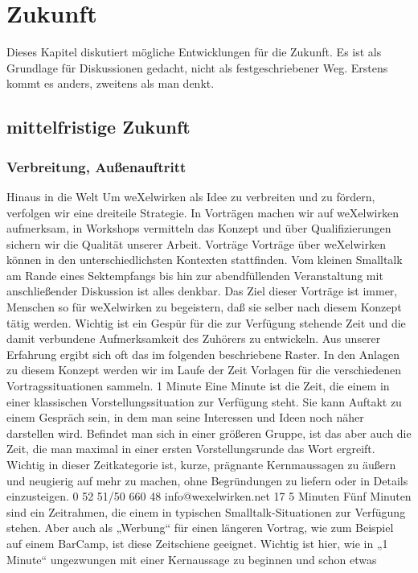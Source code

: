 \chapter{Zukunft}
Dieses Kapitel diskutiert mögliche Entwicklungen für die Zukunft.
%
Es ist als Grundlage für Diskussionen gedacht, nicht als festgeschriebener Weg.
%
Erstens kommt es anders, zweitens als man denkt.
  \section{mittelfristige Zukunft}
    \subsection{Verbreitung, Außenauftritt}
Hinaus in die Welt
Um weXelwirken als Idee zu verbreiten und zu fördern, verfolgen wir eine dreiteile Strategie. In 
Vorträgen machen wir auf weXelwirken aufmerksam, in Workshops vermitteln das Konzept und über 
Qualifizierungen sichern wir die Qualität unserer Arbeit.
Vorträge
Vorträge über weXelwirken können in den unterschiedlichsten Kontexten stattfinden. Vom kleinen 
Smalltalk am Rande eines Sektempfangs bis hin zur abendfüllenden Veranstaltung mit anschließender 
Diskussion ist alles denkbar. Das Ziel dieser Vorträge ist immer, Menschen so für weXelwirken zu 
begeistern, daß sie selber nach diesem Konzept tätig werden. Wichtig ist ein Gespür für die zur 
Verfügung stehende Zeit und die damit verbundene Aufmerksamkeit des Zuhörers zu entwickeln. Aus 
unserer Erfahrung ergibt sich oft das im folgenden beschriebene Raster. In den Anlagen zu diesem 
Konzept werden wir im Laufe der Zeit Vorlagen für die verschiedenen Vortragssituationen sammeln.
1 Minute
Eine Minute ist die Zeit, die einem in einer klassischen Vorstellungssituation zur Verfügung steht. Sie 
kann Auftakt zu einem Gespräch sein, in dem man seine Interessen und Ideen noch näher darstellen 
wird. Befindet man sich in einer größeren Gruppe, ist das aber auch die Zeit, die man maximal in einer 
ersten Vorstellungsrunde das Wort ergreift.
Wichtig in dieser Zeitkategorie ist, kurze, prägnante Kernmaussagen zu äußern und neugierig auf mehr 
zu machen, ohne Begründungen zu liefern oder in Details einzusteigen. 
0 52 51/50 660 48
info@wexelwirken.net
17
5 Minuten
Fünf Minuten sind ein Zeitrahmen, die einem in typischen Smalltalk-Situationen zur Verfügung stehen. 
Aber auch als „Werbung“ für einen längeren Vortrag, wie zum Beispiel auf einem BarCamp, ist diese 
Zeitschiene geeignet.
Wichtig ist hier, wie in „1 Minute“ ungezwungen mit einer Kernaussage zu beginnen und schon etwas 
